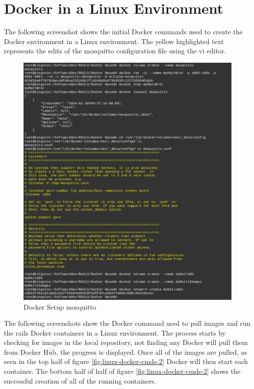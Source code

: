 \section{Docker in a Linux Environment}
\label{sec:linux-cmds}
The following screenshot shows the initial Docker commands used to create the Docker environment in a Linux environment. The yellow highlighted text represents the edits of the mosquitto configuration file using the vi editor.
\begin{figure}[H]
    \centering
    \includegraphics[scale=0.44]{../Images/mosquitto-edit-linux.png}
    \caption{Docker Setup mosquitto}
    \label{fig:linux-docker-cmds}
\end{figure}
The following screenshots show the Docker command used to pull images and run the \gls{rails} Docker containers in a Linux environment. The process starts by checking for images in the local repository, not finding any Docker will pull them from Docker Hub, the progress is displayed. Once all of the images are pulled, as seen in the top half of figure \ref{fig:linux-docker-cmds-2} Docker will then start each container. The bottom half of half of figure \ref{fig:linux-docker-cmds-2} shows the successful creation of all of the running containers.

